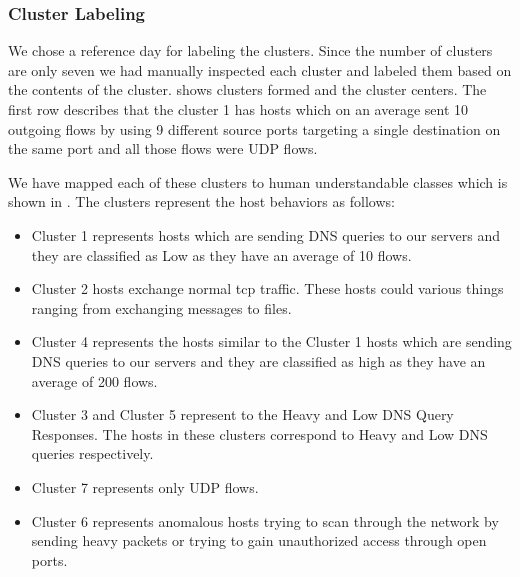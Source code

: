 \subsubsection*{Cluster Labeling}

We chose a reference day for labeling the clusters. Since the number of clusters are only seven we had manually inspected each cluster and labeled them based on the contents of the cluster.  shows clusters formed and the cluster centers. The first row describes that the cluster 1 has hosts which on an average sent 10 outgoing flows by using 9 different source ports targeting a single destination on the same port and all those flows were UDP flows. 

We have mapped each of these clusters to human understandable classes which is shown in . The clusters represent the host behaviors as follows:

\begin{itemize}
	\item Cluster 1 represents hosts which are sending DNS queries to our servers and they are classified as Low as they have an average of 10 flows. 
	
	\item Cluster 2 hosts exchange normal tcp traffic. These hosts could various things ranging from exchanging messages to files.
	
	\item Cluster 4 represents the hosts similar to the Cluster 1 hosts which are sending DNS queries to our servers and they are classified as high as they have an average of 200 flows.
	
	\item Cluster 3 and Cluster 5 represent to the Heavy and Low DNS Query Responses. The hosts in these clusters correspond to Heavy and Low DNS queries respectively.
	
	\item Cluster 7 represents only UDP flows.
	
	\item Cluster 6 represents anomalous hosts trying to scan through the network  by sending heavy packets or trying to gain unauthorized access through open ports. 
\end{itemize}

